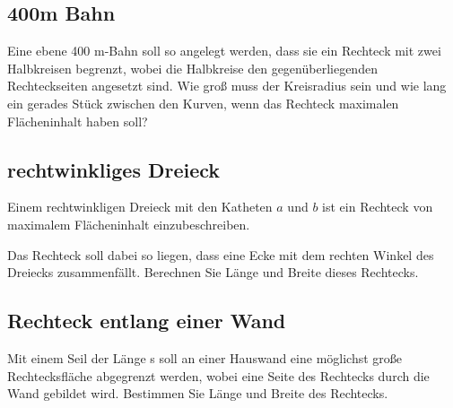 
\subsection{400m Bahn}

Eine ebene 400 m-Bahn soll so angelegt werden, dass sie ein Rechteck mit zwei
Halbkreisen begrenzt, wobei die Halbkreise den gegenüberliegenden Rechteckseiten
angesetzt sind. Wie groß muss der Kreisradius sein und wie lang ein gerades Stück
zwischen den Kurven, wenn das Rechteck maximalen Flächeninhalt haben soll?


\subsection{rechtwinkliges Dreieck}

Einem rechtwinkligen Dreieck mit den Katheten $a$ und $b$ ist ein Rechteck von
maximalem Flächeninhalt einzubeschreiben.


Das Rechteck soll dabei so liegen, dass
eine Ecke mit dem rechten Winkel des Dreiecks zusammenfällt.
Berechnen Sie Länge und Breite dieses Rechtecks.



\subsection{Rechteck entlang einer Wand}

Mit einem Seil der Länge s soll an einer Hauswand eine möglichst große Rechtecksfläche abgegrenzt werden, wobei eine Seite des Rechtecks durch die Wand gebildet
wird. Bestimmen Sie Länge und Breite des Rechtecks.

